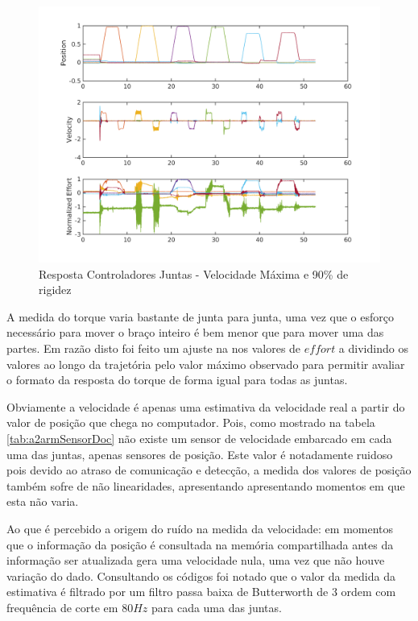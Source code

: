 \begin{figure}[H]
    \centering
    \includegraphics[width = \linewidth]{tex/figs/jointIdentificationFullSpeed_stiff90p.png}
    \caption{Resposta Controladores Juntas - Velocidade Máxima e 90\% de rigidez}
    \label{fig:jointIdentificationFullSpeed_stiff90p}
\end{figure}

A medida do torque varia bastante de junta para junta, uma vez que o esforço necessário para mover o braço inteiro é bem menor que para mover uma das partes. Em razão disto foi feito um ajuste na nos valores de $effort$ a dividindo os valores ao longo da trajetória pelo valor máximo observado para permitir avaliar o formato da resposta do torque de forma igual para todas as juntas.

Obviamente a velocidade é apenas uma estimativa da velocidade real a partir do valor de posição que chega no computador. Pois, como mostrado na tabela \ref{tab:a2armSensorDoc} não existe um sensor de velocidade embarcado em cada uma das juntas, apenas sensores de posição. Este valor é notadamente ruidoso pois devido ao atraso de comunicação e detecção, a medida dos valores de posição também sofre de não linearidades, apresentando apresentando momentos em que esta não varia.

Ao que é percebido a origem do ruído na medida da velocidade: em momentos que o informação da posição é consultada na memória compartilhada antes da informação ser atualizada gera uma velocidade nula, uma vez que não houve variação do dado. Consultando os códigos foi notado que o valor da medida da estimativa é filtrado por um filtro passa baixa de Butterworth de 3 ordem com frequência de corte em $80 Hz$ para cada uma das juntas.


